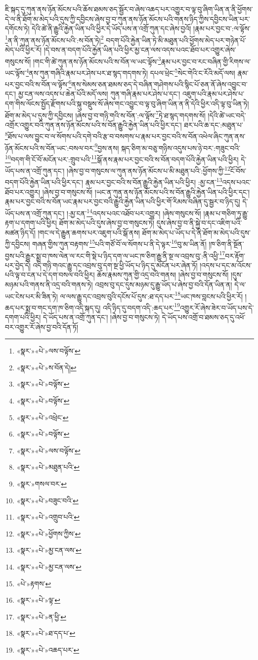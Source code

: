 ཇི་སྐད་དུ་ཀུན་ནས་ཉོན་མོངས་པའི་ཆོས་ཐམས་ཅད་སྦྱོར་བ་ཞེས་འཆད་པར་འགྱུར་བ་ལྟ་བུ་ཞིག་ཡིན་ན་ནི་ཕྱོགས་དེ་ལ་ནི་ཐོག་མ་མེད་པའི་དུས་ཀྱི་དབྱིངས་ཞེས་བྱ་བ་ཀུན་ནས་ཉོན་མོངས་པའི་གནས་ཉིད་ཀྱིས་དབྱིངས་ཡིན་པར་དགོངས་ཏེ། དེའི་ཚེ་ནི་རྒྱུའི་རྐྱེན་ཡིན་པའི་ཕྱིར་དེ་ཡོད་པས་ན་འགྲོ་ཀུན་དང་ཞེས་བྱའོ། །རྣམ་པར་བྱང་བ་:ལ་ལྟོས་\footnote{«སྣར་»«པེ་»ལས་བལྟོས་}ན་ནི་ཀུན་ནས་ཉོན་མོངས་པའི་:ས་བོན་ཏེ།\footnote{«སྣར་»«པེ་»ས་བོན་དེ།} བདག་པོའི་རྐྱེན་ཡིན་ཏེ་མི་མཐུན་པའི་ཕྱོགས་མེད་པར་གཉེན་པོ་མེད་པའི་ཕྱིར་རོ། །དེ་བས་ན་བདག་པོའི་རྐྱེན་ཡིན་པའི་ཕྱིར་མྱ་ངན་ལས་འདས་པའང་ཐོབ་པར་འགྱུར་ཞེས་གསུངས་སོ། །གང་གི་ཚེ་ཀུན་ནས་ཉོན་མོངས་པའི་ས་བོན་ལ་ཡང་ལྟོས་\footnote{«སྣར་»«པེ་»བལྟོས་}རྣམ་པར་བྱང་བ་རང་བཞིན་གྱི་རིགས་ལ་ཡང་ལྟོས་\footnote{«སྣར་»«པེ་»བལྟོས་}ནས་ཀུན་གཞིའི་རྣམ་པར་ཤེས་པར་ཐ་སྙད་གདགས་ཏེ། དཔལ་ཕྲེང་\footnote{«སྣར་»«པེ་»འཕྲེང་}སེང་གེའི་ང་རོའི་མདོ་ལས། རྣམ་པར་བྱང་བའི་ས་བོན་ལ་ལྟོས་\footnote{«སྣར་»«པེ་»བལྟོས་}ནས་སེམས་ཅན་ཐམས་ཅད་དེ་བཞིན་གཤེགས་པའི་སྙིང་པོ་ཅན་ནོ་ཞེས་འབྱུང་བ་དང་། མྱ་ངན་ལས་འདས་པ་ཆེན་པོའི་མདོ་ལས། ཀུན་གཞི་རྣམ་པར་ཤེས་པ་དང་། འཇུག་པའི་རྣམ་པར་ཤེས་པ་དག་གིས་ལོངས་སྤྱོད་རྫོགས་པའི་སྐུ་བསྡུས་སོ་ཞེས་གང་འབྱུང་བ་ལྟ་བུ་ཞིག་ཡིན་ན་ནི་དེའི་ཕྱིར་འདི་ལྟ་བུ་ཡིན་ཏེ། ཐོག་མ་མེད་པ་དུས་ཀྱི་དབྱིངས། །ཞེས་བྱ་བ་གཉི་གའི་ས་བོན་:ལ་ལྟོས་\footnote{«སྣར་»«པེ་»ལས་བལྟོས་}ཏེ་ཐ་སྙད་གདགས་སོ། །དེའི་ཚེ་ཡང་བདེ་འགྲོར་འགྱུར་བའི་ཀུན་ནས་ཉོན་མོངས་པའི་ས་བོན་རྒྱུའི་རྐྱེན་ཡིན་པའི་ཕྱིར་དང་། ཐར་པའི་ཆ་དང་:མཐུན་པ་\footnote{«སྣར་»«པེ་»མཐུན་པའི་}ཐོས་པ་ལས་བྱུང་བ་ལ་སོགས་པའི་དགེ་བའི་རྩ་བ་བསགས་པ་རྣམ་པར་བྱང་བའི་ས་བོན་འཕེལ་ཞིང་ཀུན་ནས་ཉོན་མོངས་པའི་ས་བོན་ཡང་:བསལ་བར་\footnote{«སྣར་»གསལ་བར་}བྱས་ནས། སྐད་ཅིག་མ་བཅུ་གཉིས་འདུས་པས་ཉེ་བར་:གཟུང་བའི་\footnote{«སྣར་»«པེ་»བཟུང་བའི་}བདག་གི་ངོ་བོ་མངོན་པར་:གྲུབ་པའི་\footnote{«སྣར་»«པེ་»འགྲུབ་པའི་}སྒོ་ནས་རྣམ་པར་བྱང་བའི་ས་བོན་བདག་པོའི་རྐྱེན་ཡིན་པའི་ཕྱིར། དེ་ཡོད་པས་ན་འགྲོ་ཀུན་དང་། །ཞེས་བྱ་བ་གསུངས་ལ་ཀུན་ནས་ཉོན་མོངས་པ་མི་མཐུན་པའི་:ཕྱོགས་ཀྱི་\footnote{«སྣར་»«པེ་»ཕྱོགས་ཀྱིས་}ངོ་བོས་བདག་པོའི་རྐྱེན་ཡིན་པའི་ཕྱིར་དང་། རྣམ་པར་བྱང་བའི་ས་བོན་རྒྱུའི་རྐྱེན་ཡིན་པའི་ཕྱིར། :མྱ་ངན་\footnote{«སྣར་»«པེ་»མྱ་ངན་ལས་}འདས་པའང་ཐོབ་པར་འགྱུར། །ཞེས་བྱ་བ་གསུངས་སོ། །ཡང་ན་ཀུན་ནས་ཉོན་མོངས་པའི་ས་བོན་རྒྱུའི་རྐྱེན་ཡིན་པའི་ཕྱིར་དང་། རྣམ་པར་བྱང་བའི་ས་བོན་ཡང་རྣམ་པར་བྱང་བའི་རྒྱུའི་རྐྱེན་ཡིན་པའི་ཕྱིར་གོ་རིམས་བཞིན་དུ་སྦྱར་བ་ཉིད་དུ། དེ་ཡོད་པས་ན་འགྲོ་ཀུན་དང་། །:མྱ་ངན་\footnote{«སྣར་»«པེ་»མྱ་ངན་ལས་}འདས་པའང་འཐོབ་པར་འགྱུར། །ཞེས་གསུངས་སོ། །རྣམ་པ་གཅིག་ཏུ་རྒྱུ་རྟག་པ་དགག་པའི་ཕྱིར། ཐོག་མ་མེད་པའི་དུས་ཞེས་བྱ་བ་གསུངས་ཏེ། དུས་ཞེས་བྱ་བ་ནི་སྐྱེ་བ་དང་འཇིག་པའི་མཚན་ཉིད་དོ། །གང་ལ་དེ་རྒྱུན་ཆགས་པར་འཇུག་པའི་སྒོ་ནས། ཐོག་མ་མེད་པ་ཡོད་པ་དེ་ནི་ཐོག་མ་མེད་པའི་དུས་ཀྱི་དབྱིངས། གཞན་གྱིས་ཀུན་བརྟགས་\footnote{«པེ་»རྟགས་}པའི་གཙོ་བོ་ལ་སོགས་པ་ནི་དེ་ལྟར་\footnote{«སྣར་»«པེ་»ལྟ་}བུ་མ་ཡིན་ནོ། །ཁ་ཅིག་ནི་སྔོན་བྱས་པའི་རྒྱུར་སྨྲ་བ་ཁས་ལེན་ལ་རང་གི་སྡེ་པ་ཉིད་དག་ལ་ཡང་ཁ་ཅིག་རྒྱུ་ནི་སྔ་ལ་འབྲས་བུ་:ནི་འཕྱི་\footnote{«སྣར་»«པེ་»ན་ཕྱི་}བར་རྟོག་པར་བྱེད་དེ། འདི་གཉི་གའང་རྒྱུ་དང་འབྲས་བུ་དག་སྔ་ཕྱི་ཡོད་པ་ཉིད་དུ་མངོན་པར་ཞེན་ཏོ། །འདས་པ་དང་མ་འོངས་པའི་ལྟ་བ་ངན་པ་དེ་དག་བསལ་བའི་ཕྱིར། ཆོས་རྣམས་ཀུན་གྱི་འདྲ་བའི་གནས། །ཞེས་བྱ་བ་གསུངས་སོ། །དུས་མཉམ་པའི་གནས་ནི་འདྲ་བའི་གནས་ཏེ། འབྲས་བུ་དང་དུས་མཉམ་དུ་རྒྱུ་ཡོད་པ་ཞེས་བྱ་བའི་དོན་ཡིན་ན། དེ་ལ་ཡང་ངེས་པར་མི་ཟིན་ཏེ། ལ་ལས་རྒྱུ་དང་འབྲས་བུའི་དངོས་པོ་དུས་:ཐ་དད་པར་\footnote{«སྣར་»«པེ་»ཐ་དད་པ་}ཡང་ཁས་བླངས་པའི་ཕྱིར་རོ། །ཆད་པར་སྨྲ་བ་གང་དག་ཁ་ཅིག་འདི་སྐད་དུ། འདི་ཉིད་དུ་བདག་འདི་:ཆད་པར་\footnote{«སྣར་»«པེ་»འཆད་པར་}འགྱུར་རོ་ཞེས་ཟེར་བ་ཡོད་པས་དེ་དགག་པའི་ཕྱིར། དེ་ཡོད་པས་ན་འགྲོ་ཀུན་དང་། །ཞེས་བྱ་བ་གསུངས་ཏེ། དེ་ཡོད་པས་འགྲོ་བ་ཐམས་ཅད་དུ་འཕོ་བར་འགྱུར་རོ་ཞེས་བྱ་བའི་དོན་ཏོ། 